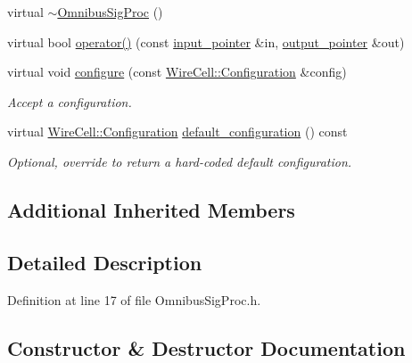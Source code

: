 \begin{DoxyCompactItemize}
\item 
virtual \hyperlink{class_wire_cell_1_1_sig_proc_1_1_omnibus_sig_proc_a3599668929a77e892fbc9385c4c62dd7}{$\sim$\+Omnibus\+Sig\+Proc} ()
\item 
virtual bool \hyperlink{class_wire_cell_1_1_sig_proc_1_1_omnibus_sig_proc_a1bda3aebba83392f79b35d4714cc8b43}{operator()} (const \hyperlink{class_wire_cell_1_1_i_function_node_a55c0946156df9b712b8ad1a0b59b2db6}{input\+\_\+pointer} \&in, \hyperlink{class_wire_cell_1_1_i_function_node_afc02f1ec60d31aacddf64963f9ca650b}{output\+\_\+pointer} \&out)
\item 
virtual void \hyperlink{class_wire_cell_1_1_sig_proc_1_1_omnibus_sig_proc_ae275bf0ab16567d97df2cfcef76e1bdc}{configure} (const \hyperlink{namespace_wire_cell_a9f705541fc1d46c608b3d32c182333ee}{Wire\+Cell\+::\+Configuration} \&config)
\begin{DoxyCompactList}\small\item\em Accept a configuration. \end{DoxyCompactList}\item 
virtual \hyperlink{namespace_wire_cell_a9f705541fc1d46c608b3d32c182333ee}{Wire\+Cell\+::\+Configuration} \hyperlink{class_wire_cell_1_1_sig_proc_1_1_omnibus_sig_proc_a2184e1c75923be1dfd36fc848cc00785}{default\+\_\+configuration} () const
\begin{DoxyCompactList}\small\item\em Optional, override to return a hard-\/coded default configuration. \end{DoxyCompactList}\end{DoxyCompactItemize}
\subsection*{Additional Inherited Members}


\subsection{Detailed Description}


Definition at line 17 of file Omnibus\+Sig\+Proc.\+h.



\subsection{Constructor \& Destructor Documentation}
\mbox{\label{class_wire_cell_1_1_sig_proc_1_1_omnibus_sig_proc_a1e1e84074c812a083b5b0433e708f377}} 
